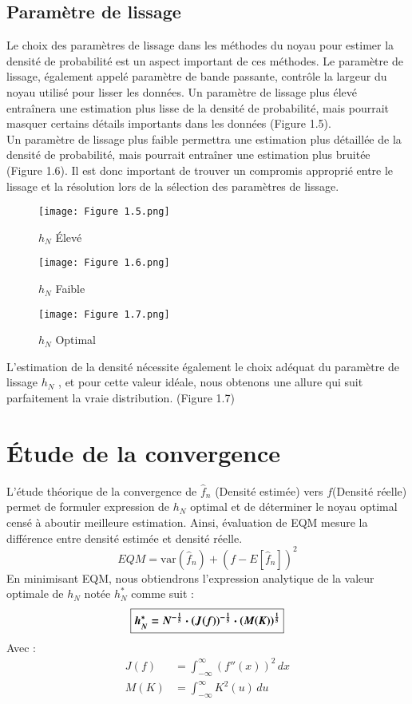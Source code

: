 \subsection{Paramètre de lissage}
Le choix des paramètres de lissage dans les méthodes du noyau pour estimer la densité de probabilité est un aspect important de ces méthodes. Le paramètre de lissage, également appelé paramètre de bande passante, contrôle la largeur du noyau utilisé pour lisser les données. Un paramètre de lissage plus élevé entraînera une estimation plus lisse de la densité de probabilité, mais pourrait masquer certains détails importants dans les données (Figure 1.5).\\ Un paramètre de lissage plus faible permettra une estimation plus détaillée de la densité de probabilité, mais pourrait entraîner une estimation plus bruitée (Figure 1.6). Il est donc important de trouver un compromis approprié entre le lissage et la résolution lors de la sélection des paramètres de lissage.
\begin{figure}[!ht]
  \centering
  \texttt{[image: Figure 1.5.png]}
  \caption{$h_N$  Élevé }
  \label{fig:$h_N$  Élevé}
\end{figure}
\begin{figure}[!ht]
  \centering
  \texttt{[image: Figure 1.6.png]}
  \caption{$h_N$  Faible }
  \label{fig:$h_N$  Faible}
\end{figure}
\begin{figure}[!ht]
  \centering
  \texttt{[image: Figure 1.7.png]}
  \caption{$h_N$  Optimal }
  \label{fig:$h_N$  Optimal}
\end{figure}
\newpage

L’estimation de la densité nécessite également le choix adéquat du paramètre de lissage $h_N$ , et pour cette valeur idéale, nous obtenons une allure qui suit parfaitement la vraie distribution. (Figure 1.7)
\section{Étude de la convergence}
L’étude théorique de la convergence de ${\hat f}_n$ (Densité estimée) vers $f$(Densité réelle) permet de formuler expression de $h_N$  optimal et de déterminer le noyau optimal censé à aboutir meilleure estimation.
Ainsi, évaluation de EQM mesure la différence entre densité estimée et densité réelle.
\begin{equation}
EQM=\text{var}({\hat f}_{n}) + \left(f - E[{\hat f}_n]\right)^2
\end{equation}
En minimisant EQM, nous obtiendrons l’expression analytique de la valeur optimale de $h_N$ notée $h^*_N$ comme suit : 
\begin{equation}
\fbox{\boldmath{$\displaystyle h^*_N = N^{-\frac{1}{5}} \cdot (J(f))^{-\frac{1}{5}} \cdot (M(K))^{\frac{1}{5}}
$}}
\end{equation}
Avec : 
\begin{align}
 J(f) &= \int_{-\infty}^{\infty} (f''(x))^2 \,dx \\ M(K) &= \int_{-\infty}^{\infty} K^2(u) \, du
\end{align}

